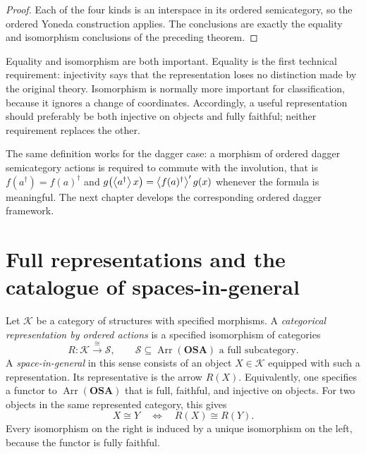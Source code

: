 \begin{proof}
Each of the four kinds is an interspace in its ordered semicategory, so
the ordered Yoneda construction applies.  The conclusions are exactly
the equality and isomorphism conclusions of the preceding theorem.
\end{proof}

\begin{rem}
Equality and isomorphism are both important.  Equality is the first
technical requirement: injectivity says that the representation loses no
distinction made by the original theory.  Isomorphism is normally more
important for classification, because it ignores a change of coordinates.
Accordingly, a useful representation should preferably be both injective
on objects and fully faithful; neither requirement replaces the other.
\end{rem}

\begin{rem}
The same definition works for the dagger case: a morphism of ordered dagger semicategory actions is required to commute with the involution, that is $f(a^{\dagger})=f(a)^{\dagger}$ and $g\bigl(\left\langle a^{\dagger}\right\rangle x\bigr)=\left\langle f(a)^{\dagger}\right\rangle'g(x)$ whenever the formula is meaningful. The next chapter develops the corresponding ordered dagger framework.
\end{rem}

\section{Full representations and the catalogue of spaces-in-general}
\label{sec-space-in-general-representation}

\begin{defn}
Let $\mathcal K$ be a category of structures with specified morphisms.
A \emph{categorical representation by ordered actions} is a specified
isomorphism of categories
\[
 R:\mathcal K\xrightarrow{\ \cong\ }\mathcal S,
 \qquad \mathcal S\subseteq\operatorname{Arr}(\mathbf{OSA})
 \text{ a full subcategory}.
\]
A \emph{space-in-general} in this sense consists of an object
$X\in\mathcal K$ equipped with such a representation. Its representative
is the arrow $R(X)$. Equivalently, one specifies a functor to
$\operatorname{Arr}(\mathbf{OSA})$ that is full, faithful, and injective on
objects. For two objects in the same represented category, this gives
\begin{equation}\label{space-in-general-isomorphism-test}
 X\cong Y\quad\Longleftrightarrow\quad R(X)\cong R(Y).
\end{equation}
Every isomorphism on the right is induced by a unique isomorphism on the
left, because the functor is fully faithful.
\end{defn}


